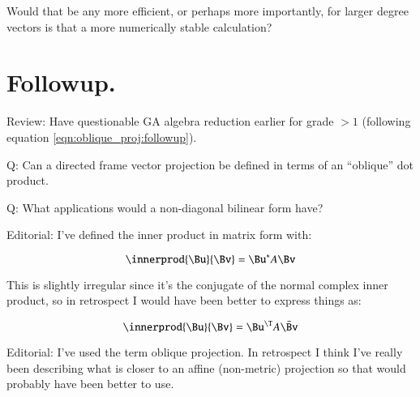 Would that be any more efficient, or perhaps more importantly, for larger degree vectors is that a more numerically stable calculation?

\section{Followup. } 

Review: Have questionable GA algebra reduction earlier for grade $>1$ (following equation \ref{eqn:oblique_proj:followup}).

Q: Can a directed frame vector projection be defined in terms of an ``oblique'' dot product.

Q: What applications would a non-diagonal bilinear form have?

Editorial: I've defined the inner product in matrix form with:

\[
\innerprod{\Bu}{\Bv} = \Bu^* A \Bv
\]

This is slightly irregular since it's the conjugate of the normal complex
inner product, so in retrospect I would have been better to express things as:

\[
\innerprod{\Bu}{\Bv} = \Bu^\T A \bar{\Bv}
\]

Editorial: I've used the term oblique projection.  In retrospect I think I've really been describing what is closer to an affine (non-metric) projection so that would probably have been better to use.
